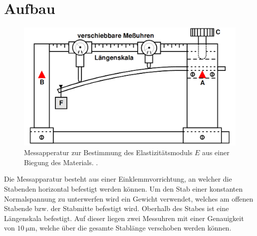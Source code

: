 \section{Aufbau}
\label{sec:Aufbau}

\begin{figure}[H]
         \centering
         \includegraphics[width=\linewidth-150pt,height=\textheight-150pt,keepaspectratio]{content/Bilder/aufbau.png}
         \caption{Messapperatur zur Bestimmung des Elastizitätsmoduls $E$ aus einer Biegung des Materials. \cite{V103}.}
         \label{fig:Aufbau}
       \end{figure}

Die Messapparatur besteht aus einer Einklemmvorrichtung, an welcher die Stabenden horizontal befestigt werden können.
Um den Stab einer konstanten Normalspannung zu unterwerfen wird ein Gewicht verwendet,
 welches am offenen Stabende bzw. der Stabmitte befestigt wird. Oberhalb des Stabes ist eine
 Längenskala befestigt. Auf dieser liegen zwei Messuhren mit einer Genauigkeit von  $\SI{10}{\micro\meter}$, welche
 über die gesamte Stablänge verschoben werden können.
